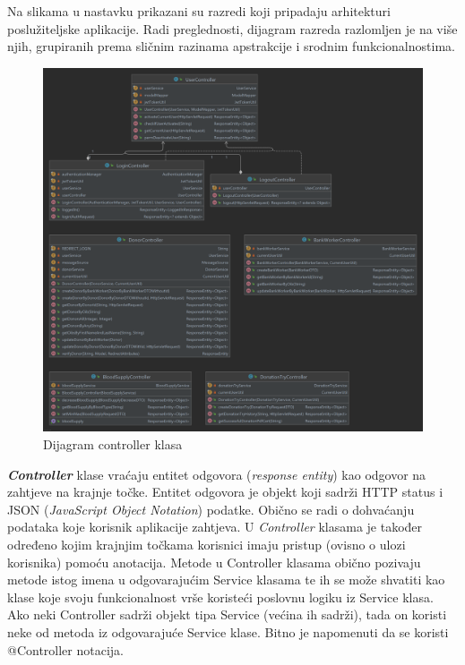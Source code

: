     Na slikama u nastavku prikazani su razredi koji pripadaju arhitekturi poslužiteljske aplikacije. Radi preglednosti, dijagram razreda razlomljen je na više njih, grupiranih prema sličnim razinama apstrakcije i srodnim funkcionalnostima.
                \begin{figure}[H]
                    \includegraphics[scale=0.20]{slike/Controller.png}
        			\centering
        			\caption{Dijagram controller klasa}
        			\label{fig:controller}
        		\end{figure}
    \textbf{\textit{Controller}} klase vraćaju entitet odgovora (\textit{response entity}) kao odgovor na zahtjeve na krajnje točke. Entitet odgovora je objekt koji sadrži HTTP status i JSON (\textit{JavaScript Object Notation}) podatke. Obično se radi o dohvaćanju podataka koje korisnik aplikacije zahtjeva. U \textit{Controller} klasama je također određeno kojim krajnjim točkama korisnici imaju pristup (ovisno o ulozi korisnika) pomoću anotacija. Metode u Controller klasama obično pozivaju metode istog imena u odgovarajućim Service klasama te ih se može shvatiti kao klase koje svoju funkcionalnost vrše koristeći poslovnu logiku iz Service klasa. Ako neki Controller sadrži objekt tipa Service (većina ih sadrži), tada on koristi neke od metoda iz odgovarajuće Service klase. Bitno je napomenuti da se koristi @Controller notacija.
    
